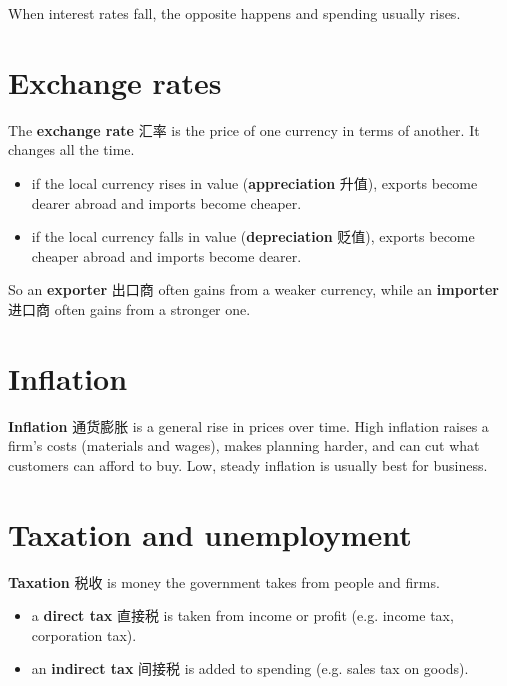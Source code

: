 \documentclass[11pt]{article}
\begin{document}
When interest rates fall, the opposite happens and spending usually rises.

\section*{Exchange rates}

The \textbf{exchange rate} 汇率 is the price of one currency in terms of another. It changes all the time.

\begin{itemize}
\item if the local currency rises in value (\textbf{appreciation} 升值), exports become dearer abroad and imports become cheaper.

\item if the local currency falls in value (\textbf{depreciation} 贬值), exports become cheaper abroad and imports become dearer.

\end{itemize}

So an \textbf{exporter} 出口商 often gains from a weaker currency, while an \textbf{importer} 进口商 often gains from a stronger one.

\section*{Inflation}

\textbf{Inflation} 通货膨胀 is a general rise in prices over time. High inflation raises a firm's costs (materials and wages), makes planning harder, and can cut what customers can afford to buy. Low, steady inflation is usually best for business.

\section*{Taxation and unemployment}

\textbf{Taxation} 税收 is money the government takes from people and firms.

\begin{itemize}
\item a \textbf{direct tax} 直接税 is taken from income or profit (e.g. income tax, corporation tax).

\item an \textbf{indirect tax} 间接税 is added to spending (e.g. sales tax on goods).

\end{itemize}
\end{document}

